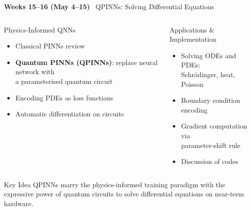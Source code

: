 \documentclass[aspectratio=169,12pt]{beamer}
\newcommand{\week}[1]{\textcolor{qgold}{\textbf{#1}}}
\begin{document}
\begin{frame}{\week{Weeks 15--16 (May 4--15)} \ QPINNs: Solving Differential Equations}
  \begin{columns}[T]
      \begin{block}{Physics-Informed QNNs}
        \begin{itemize}
          \item Classical PINNs review
          \item \textbf{Quantum PINNs (QPINNs)}:
                replace neural network with\\
                a parameterised quantum circuit
          \item Encoding PDEs as loss functions
          \item Automatic differentiation on circuits
        \end{itemize}
      \end{block}
      \begin{block}{Applications \& Implementation}
        \begin{itemize}
          \item Solving ODEs and PDEs:\\
                Schrödinger, heat, Poisson
          \item Boundary condition encoding
          \item Gradient computation via\\
                parameter-shift rule
          \item Discussion of codes
        \end{itemize}
      \end{block}
  \end{columns}
  \vspace{4pt}
  \begin{alertblock}{Key Idea}
    QPINNs marry the physics-informed training paradigm with
    the expressive power of quantum circuits to solve differential
    equations on near-term hardware.
  \end{alertblock}
\end{frame}
\end{document}
